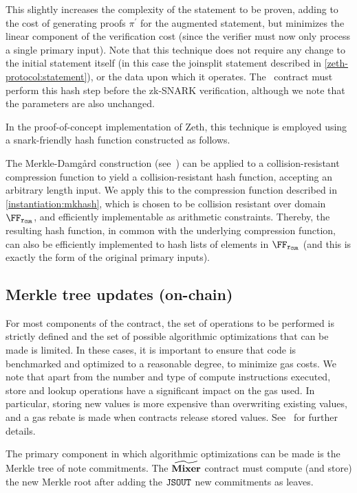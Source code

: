 This slightly increases the complexity of the statement to be proven, adding to the cost of generating proofs $\pi^\prime$ for the augmented statement, but minimizes the linear component of the verification cost (since the verifier must now only process a single primary input). Note that this technique does not require any change to the initial statement itself (in this case the joinsplit statement described in \cref{zeth-protocol:statement}), or the data upon which it operates. The \mixer~contract must perform this hash step before the zk-SNARK verification, although we note that the parameters are also unchanged.

In the proof-of-concept implementation of Zeth, this technique is employed using a snark-friendly hash function constructed as follows.

The Merkle-Damgård construction (see~\cite[Chapter 9]{menezes1996handbook}) can be applied to a collision-resistant compression function to yield a collision-resistant hash function, accepting an arbitrary length input. We apply this to the compression function described in \cref{instantiation:mkhash}, which is chosen to be collision resistant over domain $\FFx{\rCURVE}$, and efficiently implementable as arithmetic constraints. Thereby, the resulting hash function, in common with the underlying compression function, can also be efficiently implemented to hash lists of elements in $\FFx{\rCURVE}$ (and this is exactly the form of the original primary inputs).

\subsection{Merkle tree updates (on-chain)}\label{implementation:efficiency:merkle-tree-on-chain}

For most components of the contract, the set of operations to be performed is strictly defined and the set of possible algorithmic optimizations that can be made is limited. In these cases, it is important to ensure that code is benchmarked and optimized to a reasonable degree, to minimize gas costs. We note that apart from the number and type of compute instructions executed, store and lookup operations have a significant impact on the gas used. In particular, storing new values is more expensive than overwriting existing values, and a gas rebate is made when contracts release stored values. See~\cite[Appendix H.1]{ethyellowpaper} for further details.

The primary component in which algorithmic optimizations can be made is the Merkle tree of note commitments. The $\widetilde{\mathbf{Mixer}}$ contract must compute (and store) the new Merkle root after adding the $\mathtt{JSOUT}$ new commitments as leaves.

